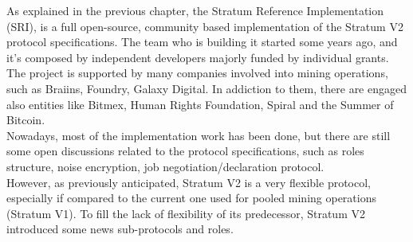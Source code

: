 As explained in the previous chapter, the Stratum Reference Implementation (SRI), is a full open-source, community based implementation of the Stratum V2 protocol specifications. The team who is building it started some years ago, and it's composed by independent developers majorly funded by individual grants. The project is supported by many companies involved into mining operations, such as Braiins, Foundry, Galaxy Digital. In addiction to them, there are engaged also entities like Bitmex, Human Rights Foundation, Spiral and the Summer of Bitcoin.\\
Nowadays, most of the implementation work has been done, but there are still some open discussions related to the protocol specifications, such as roles structure, noise encryption, job negotiation/declaration protocol.\\
However, as previously anticipated, Stratum V2 is a very flexible protocol, especially if compared to the current one used for pooled mining operations (Stratum V1). To fill the lack of flexibility of its predecessor, Stratum V2 introduced some news sub-protocols and roles.\\
